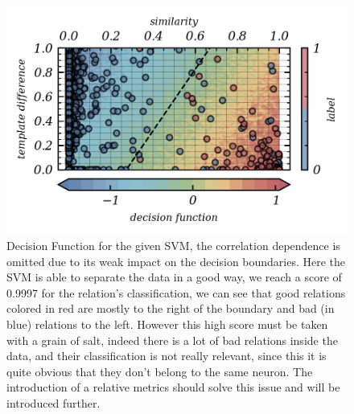 \documentclass[11pt,a4paper]{report}
\begin{document}
\begin{multicols}{2}
    \begin{figure}[H]
        \includegraphics[scale = 1]{./figure/decision_function.png}
        \caption{Decision Function for the given SVM, the correlation dependence is omitted due to its weak impact on the decision boundaries.  Here the SVM is able to separate the data in a good way, we reach a score of 0.9997 for the relation's classification, we can see that good relations colored in red are mostly to the right of the boundary and bad (in blue) relations to the left. However this high score must be taken with a grain of salt, indeed there is a lot of bad relations inside the data,
            and their classification is not really relevant, since this it is quite obvious that they don't belong to the same neuron. The introduction of a relative metrics should solve this issue and will be introduced further.}
    \end{figure}


\end{multicols}
\end{document}
